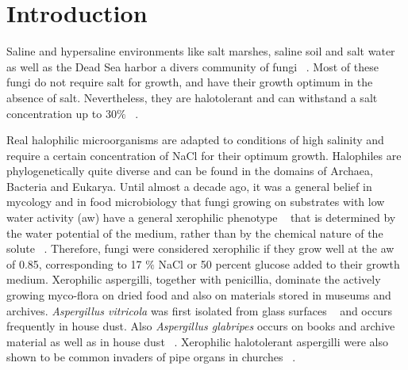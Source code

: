 \documentclass[jof,article,submit,moreauthors,pdftex,10pt,a4paper]{Definitions/mdpi}
\begin{document}



\section{Introduction}
Saline and hypersaline environments like salt marshes, saline soil and  salt water as well as the Dead Sea harbor a divers community of fungi ~\cite{Gunde-Cimerman2014}. Most of these fungi do not require salt for growth, and have their growth optimum in the absence of salt. Nevertheless, they are halotolerant and can withstand a salt concentration up to 30$\%$ ~\cite{Gunde-Cimerman2000}. 

Real halophilic microorganisms are adapted to conditions of high salinity and require a certain concentration of NaCl for their optimum growth. Halophiles are phylogenetically quite diverse and can be found in the domains of Archaea, Bacteria and Eukarya. Until almost a decade ago, it was a general belief in mycology and in food microbiology that fungi growing on substrates with low water activity (aw) have a general xerophilic phenotype ~\cite{NORTHOLT1978} that is determined by the water potential of the medium, rather than by the chemical nature of the solute ~\cite{Wheeler1993, Pitt2009}. Therefore, fungi were considered xerophilic if they grow well at the aw of 0.85, corresponding to 17 $\%$ NaCl or 50 percent glucose added to their growth medium. Xerophilic aspergilli, together with penicillia, dominate the actively growing myco-flora on dried food and also on materials stored in museums and archives. \textit{Aspergillus vitricola} was first isolated from glass surfaces ~\cite{Gunde-CimermanNFrisvadJCZalarP2005} and occurs frequently in house dust. Also \textit{Aspergillus glabripes} occurs on books and archive material as well as in house dust ~\cite{Sklenar2017}. Xerophilic halotolerant aspergilli were also shown to be common invaders of  pipe organs in churches ~\cite{Sterflinger2018}. 
\end{document}
